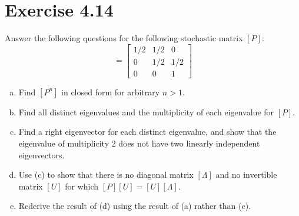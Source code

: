 \documentclass{article}
\begin{document}
    \section{Exercise 4.14}
    Answer the following questions for the following stochastic matrix $[P]$:
    \begin{equation*}
        [P]=\begin{bmatrix}
            1/2 & 1/2 & 0\\
            0 & 1/2 & 1/2\\
            0 & 0 & 1
            \end{bmatrix}
    \end{equation*}

    \begin{enumerate}[(a)]
        \item Find $[P^n]$ in closed form for arbitrary $n>1$.
        \item Find all distinct eigenvalues and the multiplicity of each eigenvalue for $[P]$.
        \item Find a right eigenvector for each distinct eigenvalue, and show that the eigenvalue of multiplicity 2 does not have two linearly independent eigenvectors.
        \item Use (c) to show that there is no diagonal matrix $[\Lambda]$ and no invertible matrix $[U]$ for which $[P][U]=[U][\Lambda]$.
        \item Rederive the result of (d) using the result of (a) rather than (c).
    \end{enumerate}
\end{document}
